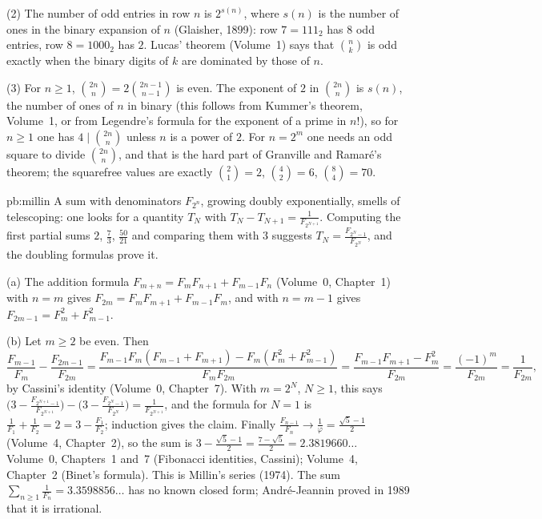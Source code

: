 (2) The number of odd entries in row $n$ is $2^{s(n)}$, where $s(n)$ is the number of ones in the binary expansion of $n$ (Glaisher, 1899): row $7=111_2$ has $8$ odd entries, row $8=1000_2$ has $2$. Lucas' theorem (Volume~1) says that $\binom nk$ is odd exactly when the binary digits of $k$ are dominated by those of $n$.

(3) For $n\ge1$, $\binom{2n}n=2\binom{2n-1}{n-1}$ is even. The exponent of $2$ in $\binom{2n}n$ is $s(n)$, the number of ones of $n$ in binary (this follows from Kummer's theorem, Volume~1, or from Legendre's formula for the exponent of a prime in $n!$), so for $n\ge1$ one has $4\mid\binom{2n}n$ unless $n$ is a power of $2$. For $n=2^m$ one needs an odd square to divide $\binom{2n}n$, and that is the hard part of Granville and Ramar\'e's theorem; the squarefree values are exactly $\binom21=2$, $\binom42=6$, $\binom84=70$.

\begin{solution}{pb:millin}
\idea A sum with denominators $F_{2^n}$, growing doubly exponentially, smells of telescoping: one looks for a quantity $T_N$
with $T_N-T_{N+1}=\frac1{F_{2^{N+1}}}$. Computing the first partial sums $2$, $\frac73$, $\frac{50}{21}$ and comparing them
with $3$ suggests $T_N=\frac{F_{2^N-1}}{F_{2^N}}$, and the doubling formulas prove it.

\writeup (a) The addition formula $F_{m+n}=F_mF_{n+1}+F_{m-1}F_n$ (Volume~0, Chapter~1) with $n=m$ gives
$F_{2m}=F_mF_{m+1}+F_{m-1}F_m$, and with $n=m-1$ gives $F_{2m-1}=F_m^2+F_{m-1}^2$.

(b) Let $m\ge2$ be even. Then
\[
\frac{F_{m-1}}{F_m}-\frac{F_{2m-1}}{F_{2m}}=\frac{F_{m-1}F_m(F_{m-1}+F_{m+1})-F_m(F_m^2+F_{m-1}^2)}{F_mF_{2m}}
=\frac{F_{m-1}F_{m+1}-F_m^2}{F_{2m}}=\frac{(-1)^m}{F_{2m}}=\frac1{F_{2m}},
\]
by Cassini's identity (Volume~0, Chapter~7). With $m=2^N$, $N\ge1$, this says $\bigl(3-\frac{F_{2^{N+1}-1}}{F_{2^{N+1}}}\bigr)-
\bigl(3-\frac{F_{2^N-1}}{F_{2^N}}\bigr)=\frac1{F_{2^{N+1}}}$, and the formula for $N=1$ is
$\frac1{F_1}+\frac1{F_2}=2=3-\frac{F_1}{F_2}$; induction gives the claim. Finally $\frac{F_{n-1}}{F_n}\to\frac1\varphi=
\frac{\sqrt5-1}2$ (Volume~4, Chapter~2), so the sum is $3-\frac{\sqrt5-1}2=\frac{7-\sqrt5}2=2.3819660\ldots$
\tools Volume~0, Chapters~1 and~7 (Fibonacci identities, Cassini); Volume~4, Chapter~2 (Binet's formula).
\leads This is Millin's series (1974). The sum $\sum_{n\ge1}\frac1{F_n}=3.3598856\ldots$ has no known closed form; André-Jeannin
proved in 1989 that it is irrational.
\end{solution}


